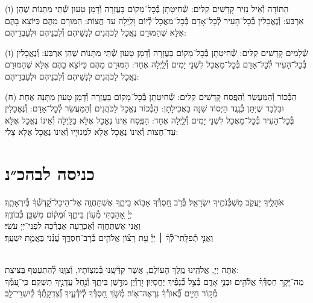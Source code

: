 \documentclass[twoside, openany, parskip=half, 11pt]{book}
\begin{document}
(ו) הַתּוֹדָה וְ֯אֵיל נָזִיר קׇדָשִׁים קַלִּים: שְׁ֯חִיטָתָן בְּ֯כׇל־מָקוֹם בָּעֲזָרָה וְ֯דָמָן טָעוּן שְׁ֯תֵּי מַתָּנוֹת שֶׁהֵן אַרְבַּע: וְ֯נֶאֱכָלִין בְּ֯כׇל־הָעִיר לְ֯כׇל־אָדָם בְּ֯כׇל־מַאֲכׇל־לְ֯יוֹם וָלַֽיְלָה עַד חֲצוֹת: הַמּוּרָם מֵהֶם כַּיּוֹצֵא בָהֶם אֶלָּא שֶׁהַמּוּרָם נֶאֱכָל לַכֹּהֲנִים לִנְשֵׁיהֶם וְ֯לִבְנֵיהֶם וּלְעַבְדֵיהֶם:

(ז) שְׁ֯לָמִים קׇדָשִׁים קַלִּים: שְׁ֯חִיטָתָן בְּ֯כׇל־מָקוֹם בָּעֲזָרָה וְ֯דָמָן טָעוּן שְׁ֯תֵּי מַתָּנוֹת שֶׁהֵן אַרְבַּע: וְ֯נֶאֱכָלִין בְּ֯כׇל־הָעִיר לְ֯כׇל־אָדָם בְּ֯כׇל־מַאֲכָל לִשְׁנֵי יָמִים וְ֯לַֽיְלָה אֶחָד: הַמּוּרָם מֵהֶם כַּיּוֹצֵא בָהֶם אֶלָּא שֶׁהַמּוּרָם נֶאֱכָל לַכֹּהֲנִים לִנְשֵׁיהֶם וְ֯לִבְנֵיהֶם וּלְעַבְדֵיהֶם:

(ח) הַבְּ֯כוֹר וְ֯הַמַּעֲשֵׂר וְ֯הַפֶּֽסַח קׇדָשִׁים קַלִּים: שְׁ֯חִיטָתָן בְּ֯כׇל־מָקוֹם בָּעֲזָרָה וְ֯דָמָן טָעוּן מַתָּנָה אֶחָת וּבִלְבָד שֶׁיִּתֵּן כְּ֯נֶֽגֶד הַיְסוֹד שִׁנָּה בַאֲכִילָתָן: הַבְּ֯כוֹר נֶאֱכָל לַכֹּהֲנִים וְ֯הַמַּעֲשֵׂר לְ֯כׇל־אָדָם: וְ֯נֶּאֱכָלִין בְּ֯כׇל־הָעִיר בְּ֯כׇל־מַאֲכָל לִשְׁנֵי יָמִים וְ֯לַֽיְלָה אֶחָד: הַפֶּֽסַח אֵינוֹ נֶאֱכָל אֶלָּא בַלַּֽיְלָה וְ֯אֵינוֹ נֶאֱכָל אֶלָּא עַד־חֲצוֹת וְ֯אֵינוֹ נֶאֱכָל אֶלָּא לִמְנוּיָיו וְ֯אֵינוֹ נֶאֱכָל אֶלָּא צָלִי:\\


\section[כניסה לבהכ״נ]{ כניסה לבהכ״נ }
אֹהָלֶ֖יךָ יַעֲקֹ֑ב מִשְׁכְּ֯נֹתֶ֖יךָ יִשְׂרָאֵֽל׃
בְּ֯רֹ֣ב חַ֭סְדְּ֯ךָ אָב֣וֹא בֵיתֶ֑ךָ אֶשְׁתַּחֲוֶ֥ה אֶל־הֵיכַל־קׇ֝דְשְׁ֯ךָ֗ בְּ֯יִרְאָתֶֽךָ׃\\
יְיָ֗ אָ֭הַבְתִּי מְ֯ע֣וֹן בֵּיתֶ֑ךָ וּ֝מְק֗וֹם מִשְׁכַּ֥ן כְּ֯בוֹדֶֽךָ׃ \\
וַאֲנִי אֶשְׁתַּחֲוֶה וְ֯אֶכְרָֽעָה אֶבְרְ֯כָה לִפְנֵי־יְיָ עֹשִׂי׃\\
וַאֲנִ֤י
%
תְ֯פִלָּֽתִי־לְ֯ךָ֨ ׀ יְיָ֡ עֵ֤ת רָצ֗וֹן אֱלֹהִ֥ים בְּ֯רׇב־חַסְדֶּ֑ךָ עֲ֝נֵ֗נִי בֶּאֱמֶ֥ת יִשְׁעֶֽךָ׃

\\
אַתָּה יְיָ, אֱלֹהֵֽינוּ מֶֽלֶךְ הָעוֹלָם, אֲשֶׁר קִדְּ֯שָֽׁנוּ בְּ֯מִצְוֹתָיו, וְ֯צִוָּֽנוּ לְ֯הִתְעַטֵּף בַּצִּיצִת:\\
מַה־יָּקָ֥ר חַסְדְּ֯ךָ֗ אֱלֹ֫הִ֥ים וּבְנֵ֥י אָדָ֑ם בְּ֯צֵ֥ל כְּ֯֝נָפֶ֗יךָ יֶחֱסָיֽוּן׃
יִ֭רְוְ֯יֻן מִדֶּ֣שֶׁן בֵּיתֶ֑ךָ וְ֯נַ֖חַל עֲדָנֶ֣יךָ תַשְׁקֵֽם׃
כִּֽי־עִ֭מְּ֯ךָ מְ֯ק֣וֹר חַיִּ֑ים בְּ֯֝אוֹרְ֯ךָ֗ נִרְאֶה־אֽוֹר׃
מְ֯שֹׁ֣ךְ חַ֭סְדְּ֯ךָ לְ֯יֹדְ֯עֶ֑יךָ וְ֯֝צִדְקָֽתְ֯ךָ֗ לְ֯יִשְׁרֵי־לֵֽב׃
\end{document}
